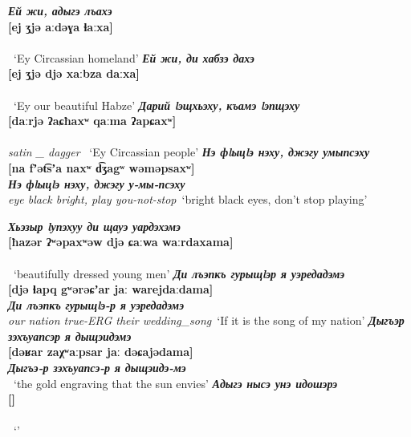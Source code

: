 \documentclass[a4paper,12pt]{book}
\newcommand{\1}[1]{\textbf{\emph{#1}}} %
\newcommand{\2}[1]{\textbf{[#1]}} %
\newcommand{\3}[1]{\fontsize{11pt}{0cm}\textbf{\emph{#1}}} %
\newcommand{\4}[1]{\fontsize{10pt}{0cm}\emph{#1}}	%
\newcommand{\5}[1]{\textbf{/#1/}} %
\newcommand{\6}[1]{\textbf{[#1]}} %
\newcommand{\7}[1]{\fontsize{12pt}{0cm}\emph{#1}} %
\newcommand{\8}[1]{\fontsize{12pt}{0cm}`#1'} %
\newcommand{\9}[1]{\fontsize{12pt}{0cm}(lit. `#1')} %
\begin{document}
\begin{exe}
\ex
\1{Ей жи, адыгэ лъахэ}\\
\2{ej ʒjə aːdəɣa ɬaːxa}\\
\3{}\\
\4{}\
\trans \8{Ey Circassian homeland}
\ex
\1{Ей жи, ди хабзэ дахэ}\\
\2{ej ʒjə djə xaːbza daːxa}\\
\3{}\\
\4{}\
\trans \8{Ey our beautiful Habze}
\ex
\1{Дарий lэщхьэху, къамэ lэпщэху}\\
\2{daːrjə ʔaɕħaxʷ qaːma ʔapɕaxʷ}\\
\3{}\\
\4{satin _ dagger }\
\trans \8{Ey Circassian people}
\ex
\1{Нэ фlыцlэ нэху, джэгу умыпсэху}\\
\2{na fʼət͡sʼa naxʷ d͡ʒagʷ wəməpsaxʷ}\\
\3{Нэ фlыцlэ нэху, джэгу у-мы-псэху}\\
\4{eye black bright, play you-not-stop}\
\trans \8{bright black eyes, don't stop playing}

\end{exe}

\begin{exe}
\ex
\1{Хьэзыр lупэхуу ди щауэ уардэхэмэ}\\
\2{ħazər ʔʷəpaxʷəw djə ɕaːwa waːrdaxama}\\
\3{}\\
\4{}\
\trans \8{beautifully dressed young men}
\ex
\1{Ди лъэпкъ гурыщlэр я уэредадэмэ}\\
\2{djə ɬapq gʷərəɕʼar jaː warejdaːdama}\\
\3{Ди лъэпкъ гурыщlэ-р я уэредадэмэ}\\
\4{our nation true-ERG their wedding\_song}\
\trans \8{If it is the song of my nation}
\ex
\1{Дыгъэр зэхъуапсэр я дыщэидэмэ}\\
\2{dəʁar zaχʷaːpsar jaː dəɕajədama}\\
\3{Дыгъэ-р зэхъуапсэ-р я дыщэидэ-мэ}\\
\4{}\
\trans \8{the gold engraving that the sun envies}
\ex
\1{Адыгэ нысэ унэ идошэрэ}\\
\2{}\\
\3{}\\
\4{}\
\trans \8{}

\end{exe}
\end{document}
